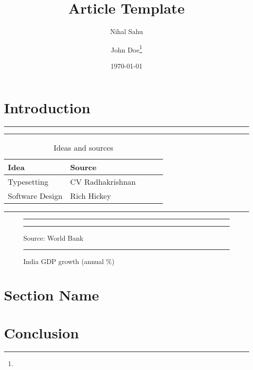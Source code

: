 \documentclass[a4paper]{article}
\title{Article Template}
\author{Nihal Sahu \and John Doe\thanks{\lipsum[4]}}
\date{\today}
\newenvironment{floatintro}{\bigskip\footnotesize}{\bigskip}
\begin{document}
\maketitle
\begin{abstract}
    \lipsum[5]
\end{abstract}
\newpage
\tableofcontents
\newpage

\section{Introduction}
\lipsum

\begin{table}[htbp]
\hrule height 1pt\medskip
\caption{Ideas and sources}
\hrule
\begin{floatintro}
    \lipsum[4]
\end{floatintro}
\footnotesize\begin{center}
    \begin{tabular}{ l l l l l }
    \midrule
    Idea & Source \\\midrule
    Typesetting & CV Radhakrishnan \\
    Software Design & Rich Hickey \\
    \end{tabular}
\end{center}
\medskip
\hrule
\end{table}

\begin{figure}
\hrule height 1pt\medskip
\caption{India GDP growth (annual \%)}
\hrule
\begin{floatintro}
    \lipsum[4]    
\end{floatintro}
\footnotesize\begin{center}
\end{center}
\medskip
Source: World Bank
\smallskip
\hrule
\end{figure}

\section{Section Name}
\lipsum
\section{Conclusion}
\lipsum
\end{document}
